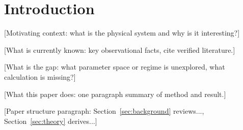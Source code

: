 \section{Introduction}
\label{sec:introduction}


[Motivating context: what is the physical system and why is it interesting?]

[What is currently known: key observational facts, cite verified literature.]

[What is the gap: what parameter space or regime is unexplored, what calculation is missing?]

[What this paper does: one paragraph summary of method and result.]

[Paper structure paragraph: Section~\ref{sec:background} reviews..., Section~\ref{sec:theory} derives...]
